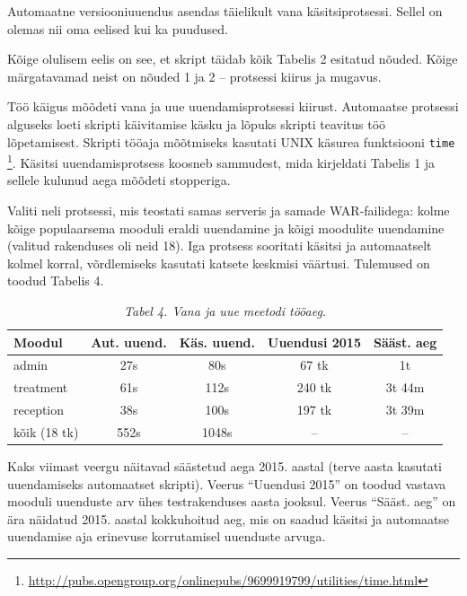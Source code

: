\documentclass[12pt]{article}
\newcommand{\code}[1]{\texttt{#1}}
\begin{document}
  Automaatne versiooniuuendus asendas täielikult vana käsitsiprotsessi. Sellel on olemas nii oma eelised kui ka puudused.
  
  Kõige olulisem eelis on see, et skript täidab kõik Tabelis 2 esitatud nõuded. Kõige märgatavamad neist on nõuded 1 ja 2 \--- protsessi kiirus ja mugavus.
  
  Töö käigus mõõdeti vana ja uue uuendamisprotsessi kiirust. Automaatse protsessi alguseks loeti skripti käivitamise käsku ja lõpuks skripti teavitus töö lõpetamisest. Skripti tööaja mõõtmiseks kasutati UNIX käsurea funktsiooni \code{time} \footnote{\url{http://pubs.opengroup.org/onlinepubs/9699919799/utilities/time.html}}. Käsitsi uuendamisprotsess koosneb sammudest, mida kirjeldati Tabelis 1 ja sellele kulunud aega mõõdeti stopperiga.
  
  Valiti neli protsessi, mis teostati samas serveris ja samade WAR\--failidega: kolme kõige populaarsema mooduli eraldi uuendamine ja kõigi moodulite uuendamine (valitud rakenduses oli neid 18). Iga protsess sooritati käsitsi ja automaatselt kolmel korral, võrdlemiseks kasutati katsete keskmisi väärtusi. Tulemused on toodud Tabelis 4.
  
  \begin{table}[!htbp]
    \begin{center}
      \caption*{\textit{Tabel 4. Vana ja uue meetodi tööaeg.}}
      
      \begin{tabular}{| l | c | c | c | c |}
        \hline
         \textbf{Moodul} & \textbf{Aut. uuend.} & \textbf{Käs. uuend.} & \textbf{Uuendusi 2015} & \textbf{Sääst. aeg}\\
        \hline
        admin & 27s & 80s & 67 tk & 1t\\
        treatment & 61s & 112s & 240 tk & 3t 44m\\
        reception & 38s & 100s & 197 tk & 3t 39m \\
        kõik (18 tk) & 552s & 1048s & \--- & \---\\
        \hline
      \end{tabular}
    \end{center}
  \end{table}
  
  Kaks viimast veergu näitavad säästetud aega 2015. aastal (terve aasta kasutati uuendamiseks automaatset skripti). Veerus ``Uuendusi 2015'' on toodud vastava mooduli uuenduste arv ühes testrakenduses aasta jooksul. Veerus ``Sääst. aeg'' on ära näidatud 2015. aastal kokkuhoitud aeg, mis on saadud käsitsi ja automaatse uuendamise aja erinevuse korrutamisel uuenduste arvuga.
  
\end{document}

